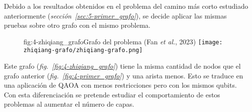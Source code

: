 Debido a los resultados obtenidos en el problema del camino más corto estudiado anteriormente (\textit{sección~\ref{sec:5-primer_grafo}}), se decide aplicar las mismas pruebas sobre otro grafo con el mismo problema.

\begin{figure}[Grafo para estudio de capas {--} camino más corto]{fig:4-zhiqiang_grafo}{Grafo del problema (Fan \textit{et al.}, 2023\cite{solving_shortest_path_with_qaoa})}
  \centering
  \texttt{[image: zhiqiang-grafo/zhiqiang-grafo.png]}
\end{figure}

Este grafo (\textit{fig.~\ref{fig:4-zhiqiang_grafo}}) tiene la misma cantidad de nodos que el grafo anterior (\textit{fig.~\ref{fig:4-primer_grafo}}) y una arista menos.
Esto se traduce en una aplicación de QAOA con menos restricciones pero con los mismos qubits.
\\
Con esta diferenciación se pretende estudiar el comportamiento de estos problemas al aumentar el número de capas.

